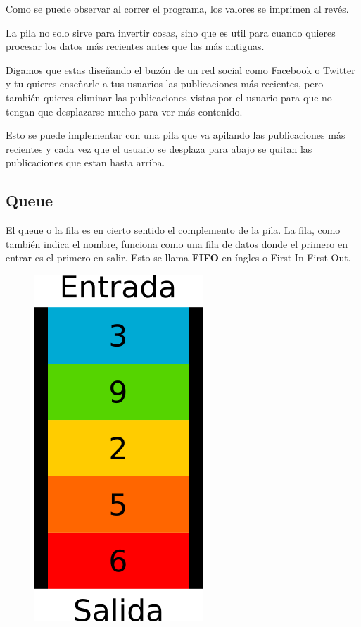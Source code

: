 \documentclass{article}
\begin{document}
Como se puede observar al correr el programa, los valores se imprimen al revés.

La pila no solo sirve para invertir cosas, sino que es util para cuando quieres procesar los datos más recientes antes que las más antiguas.

Digamos que estas diseñando el buzón de un red social como Facebook o Twitter y tu quieres enseñarle a tus usuarios las publicaciones más recientes, pero también quieres eliminar las publicaciones vistas por el usuario para que no tengan que desplazarse mucho para ver más contenido.

Esto se puede implementar con una pila que va apilando las publicaciones más recientes y cada vez que el usuario se desplaza para abajo se quitan las publicaciones que estan hasta arriba.

\subsection{Queue}

El queue o la fila es en cierto sentido el complemento de la pila. La fila, como también indica el nombre, funciona como una fila de datos donde el primero en entrar es el primero en salir. Esto se llama \textbf{FIFO} en íngles o First In First Out.

\begin{figure}[H]
    \centering
    \includegraphics[width=0.1\paperwidth]{fila}
\end{figure}
\end{document}
